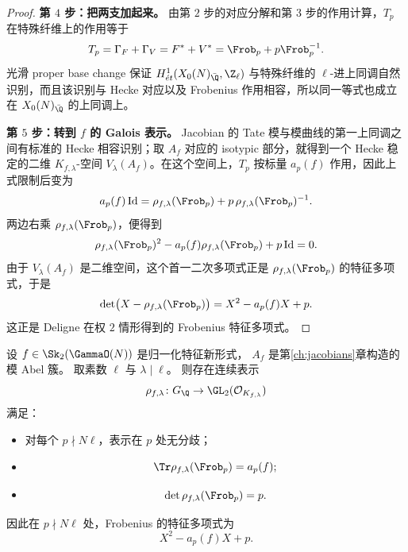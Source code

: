 \begin{proof}
\textbf{第 $4$ 步：把两支加起来。}
由第 $2$ 步的对应分解和第 $3$ 步的作用计算，$T_p$ 在特殊纤维上的作用等于
\[
T_p=\Gamma_F+\Gamma_V=F^*+V^*=\Frob_p+p\Frob_p^{-1}.
\]
光滑 proper base change 保证 $H^1_{\acute{e}t}(X_0(N)_{\bar{\Q}},\Z_\ell)$ 与特殊纤维的 $\ell$-进上同调自然识别，而且该识别与 Hecke 对应以及 Frobenius 作用相容，所以同一等式也成立在 $X_0(N)_{\bar{\Q}}$ 的上同调上。

\textbf{第 $5$ 步：转到 $f$ 的 Galois 表示。}
Jacobian 的 Tate 模与模曲线的第一上同调之间有标准的 Hecke 相容识别；取 $A_f$ 对应的 isotypic 部分，就得到一个 Hecke 稳定的二维 $K_{f,\lambda}$-空间 $V_\lambda(A_f)$。在这个空间上，$T_p$ 按标量 $a_p(f)$ 作用，因此上式限制后变为
\[
a_p(f)\,\mathrm{Id}=\rho_{f,\lambda}(\Frob_p)+p\,\rho_{f,\lambda}(\Frob_p)^{-1}.
\]
两边右乘 $\rho_{f,\lambda}(\Frob_p)$，便得到
\[
\rho_{f,\lambda}(\Frob_p)^2-a_p(f)\rho_{f,\lambda}(\Frob_p)+p\,\mathrm{Id}=0.
\]
由于 $V_\lambda(A_f)$ 是二维空间，这个首一二次多项式正是 $\rho_{f,\lambda}(\Frob_p)$ 的特征多项式，于是
\[
\det\bigl(X-\rho_{f,\lambda}(\Frob_p)\bigr)=X^2-a_p(f)X+p.
\]
这正是 Deligne 在权 $2$ 情形得到的 Frobenius 特征多项式。
\end{proof}

\begin{theorem}
\label{thm:ch09-deligne-weight-two}
设 $f\in \Sk_2(\GammaO(N))$ 是归一化特征新形式，
$A_f$ 是第\ref{ch:jacobians}章构造的模 Abel 簇。
取素数 $\ell$ 与 $\lambda\mid \ell$。
则存在连续表示
\[
  \rho_{f,\lambda}\colon G_\Q\to \GL_2(\mathcal O_{K_{f,\lambda}})
\]
满足：
\begin{itemize}
  \item[(i)] 对每个 $p\nmid N\ell$，表示在 $p$ 处无分歧；
  \item[(ii)]
  \[
    \Tr\rho_{f,\lambda}(\Frob_p)=a_p(f);
  \]
  \item[(iii)]
  \[
    \det\rho_{f,\lambda}(\Frob_p)=p.
  \]
\end{itemize}
因此在 $p\nmid N\ell$ 处，Frobenius 的特征多项式为
\[
  X^2-a_p(f)X+p.
\]
\end{theorem}

